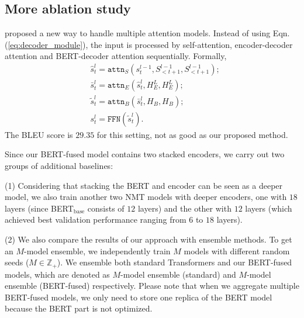 \documentclass{article} \usepackage{iclr2020_conference,times}
\newcommand{\attn}{\texttt{attn}}
\newcommand{\ffn}{\texttt{FFN}}
\newcommand{\myeqref}[1]{Eqn.(\ref{#1})}
\begin{document}
\subsection{More ablation study}\label{app:more-ablation-study}


\cite{junczys2018ms} proposed a new way to handle multiple attention models. Instead of using \myeqref{eq:decoder_module}, the input is processed by self-attention, encoder-decoder attention and BERT-decoder attention sequentially. Formally,
\begin{equation}
\begin{aligned}
&\hat{s}^l_{t}=\attn_S(s^{l-1}_t, S^{l-1}_{<t+1},S^{l-1}_{<t+1});\\
&\bar{s}^l_t=\attn_E(\hat{s}^l_{t}, H_E^L,H_E^L);\\
& \tilde{s}^l_{t}=\attn_B(\bar{s}^l_{t}, H_B,H_B);\\
&s^l_t = \ffn(\tilde{s}^l_t).
\end{aligned}
\label{eq:decoder_module_stack}
\end{equation}
The BLEU score is $29.35$ for this setting, not as good as our proposed method.


Since our BERT-fused model contains two stacked encoders, we carry out two groups of additional baselines:

\noindent(1) Considering that stacking the BERT and encoder can be seen as a deeper model, we also train another two NMT models with deeper encoders, one with $18$ layers (since BERT$_\text{base}$ consists of $12$ layers) and the other with $12$ layers (which achieved best validation performance ranging from $6$ to $18$ layers). 

\noindent(2) We also compare the results of our approach with ensemble methods. To get an $M$-model ensemble, we independently train $M$ models with different random seeds ($M\in\mathbb{Z}_+$). We ensemble both standard Transformers and our BERT-fused  models, which are denoted as $M$-model ensemble (standard) and $M$-model ensemble (BERT-fused) respectively. Please note that when we aggregate multiple BERT-fused  models, we only need to store one replica of the BERT model because the BERT part is not optimized.
\end{document}
